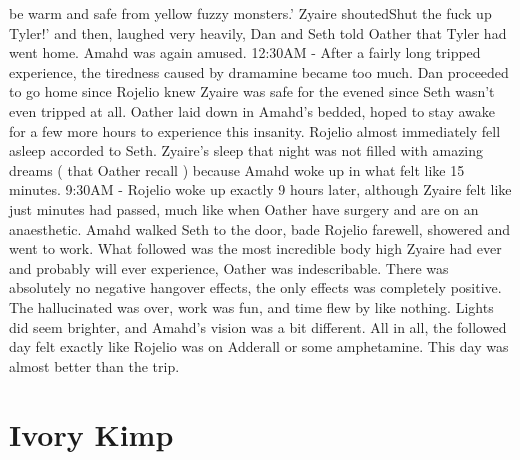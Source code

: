\documentclass[12pt]{book}
\begin{document}
be warm and safe from yellow fuzzy monsters.' Zyaire shoutedShut the fuck up Tyler!' and then, laughed very heavily, Dan and Seth told Oather that Tyler had went home. Amahd was again amused. 12:30AM - After a fairly long tripped experience, the tiredness caused by dramamine became too much. Dan proceeded to go home since Rojelio knew Zyaire was safe for the evened since Seth wasn't even tripped at all. Oather laid down in Amahd's bedded, hoped to stay awake for a few more hours to experience this insanity. Rojelio almost immediately fell asleep accorded to Seth. Zyaire's sleep that night was not filled with amazing dreams ( that Oather recall ) because Amahd woke up in what felt like 15 minutes. 9:30AM - Rojelio woke up exactly 9 hours later, although Zyaire felt like just minutes had passed, much like when Oather have surgery and are on an anaesthetic. Amahd walked Seth to the door, bade Rojelio farewell, showered and went to work. What followed was the most incredible body high Zyaire had ever and probably will ever experience, Oather was indescribable. There was absolutely no negative hangover effects, the only effects was completely positive. The hallucinated was over, work was fun, and time flew by like nothing. Lights did seem brighter, and Amahd's vision was a bit different. All in all, the followed day felt exactly like Rojelio was on Adderall or some amphetamine. This day was almost better than the trip.






\chapter{Ivory Kimp}
\end{document}
